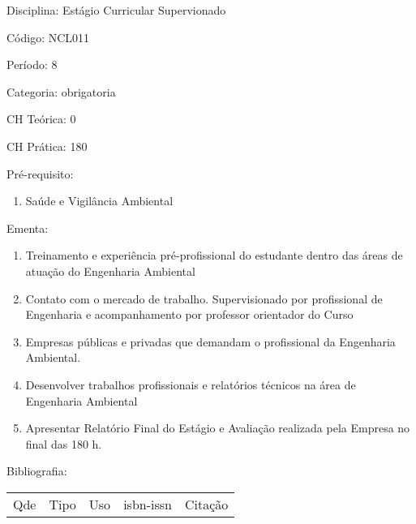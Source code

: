 \documentclass[12pt,a4paper,twoside]{report}
\begin{document}
Disciplina: Estágio Curricular Supervionado

Código: NCL011

Período: 8

Categoria: obrigatoria

CH Teórica: 0

CH Prática: 180




Pré-requisito:
\begin{enumerate}
\item Saúde e Vigilância Ambiental
\end{enumerate}

Ementa:
\begin{enumerate}
\item Treinamento e experiência pré-profissional do estudante  dentro das áreas de atuação do Engenharia Ambiental
\item Contato com o mercado de trabalho. Supervisionado por profissional de Engenharia e acompanhamento por professor orientador do Curso
\item Empresas públicas e privadas que demandam o profissional da Engenharia Ambiental.
\item Desenvolver trabalhos profissionais e relatórios técnicos na área de Engenharia Ambiental
\item Apresentar Relatório Final do Estágio e Avaliação realizada pela Empresa no final das 180 h.
\end{enumerate}



Bibliografia:


\begin{tabular}{llllp{8cm}}
Qde & Tipo & Uso & isbn-issn & Citação \\
\end{tabular}
\end{document}
